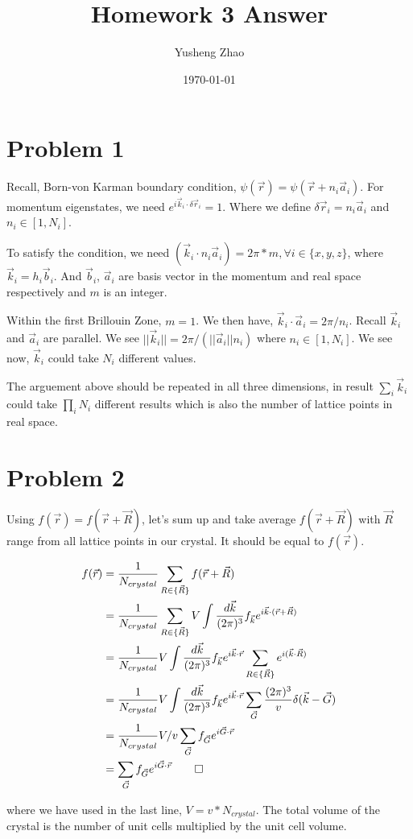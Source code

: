 \documentclass[11pt]{article}
\author{Yusheng Zhao}
\date{\today}
\title{Homework 3 Answer}
\begin{document}
\maketitle


\section{Problem 1}
\label{sec:org602696d}
Recall, Born-von Karman boundary condition, \(\psi(\vec{r}) =
\psi(\vec{r}+n_{i}\vec{a}_{i})\). For momentum eigenstates, we need \(e^{i
\vec{k}_{i}\cdot \delta \vec{r}_{i}} = 1\). Where we define \(\delta \vec{r}_{i}
= n_{i} \vec{a}_{i}\) and \(n_{i} \in [1,N_{i}]\).

To satisfy the condition, we need \((\vec{k}_{i} \cdot n_{i} \vec{a}_{i} ) =
2\pi * m, \forall i \in \{x,y,z\}\), where \(\vec{k}_{i} = h_{i} \vec{b}_{i}\). And
\(\vec{b}_{i}\), \(\vec{a}_{i}\) are basis vector in the momentum and real space
respectively and \(m\) is an integer.

Within the first Brillouin Zone, \(m=1\). We then have, \(\vec{k}_{i} \cdot
\vec{a}_{i} = 2\pi /n_{i}\). Recall \(\vec{k}_{i}\) and \(\vec{a}_{i}\) are
parallel. We see \(||\vec{k}_{i}|| = 2\pi /(||\vec{a}_{i}||n_{i})\) where \(n_{i}
\in [1,N_{i}]\). We see now, \(\vec{k}_{i}\) could take \(N_{i}\) different values.

The arguement above should be repeated in all three dimensions, in result
\(\sum_{i} \vec{k}_{i}\) could take \(\prod_{i}N_{i}\) different results which is
also the number of lattice points in real space.

\section{Problem 2}
\label{sec:orga628091}
Using \(f(\vec{r}) = f(\vec{r} + \vec{R})\), let's sum up and take average
\(f(\vec{r}+\vec{R})\) with \(\vec{R}\) range from all lattice points in our
crystal. It should be equal to \(f(\vec{r})\).



\begin{align*}
f(\vec{r}) & = \frac{1}{N_{crystal}} \sum_{R\in\{\vec{R}\}} f(\vec{r}+\vec{R}) \\
           & = \frac{1}{N_{crystal}} \sum_{R\in\{\vec{R}\}} V \int \frac{d\vec{k}}{(2\pi)^{3}} f_{\vec{k}} e^{i \vec{k}\cdot (\vec{r}+\vec{R})}\\
           & = \frac{1}{N_{crystal}}  V \int \frac{d\vec{k}}{(2\pi)^{3}} f_{\vec{k}}  e^{i \vec{k} \cdot \vec{r}} \sum_{R\in\{\vec{R}\}} e^{ i (\vec{k} \cdot \vec{R})}\\
           & = \frac{1}{N_{crystal}}  V \int \frac{d\vec{k}}{(2\pi)^{3}} f_{\vec{k}}  e^{i \vec{k}\cdot \vec{r}} \sum_{\vec{G}} \frac{(2\pi)^{3}}{v} \delta (\vec{k}-\vec{G})\\
           & = \frac{1}{N_{crystal}}  V/v \sum_{\vec{G}} f_{\vec{G}} e^{i\vec{G}\cdot \vec{r}}\\
           & = \sum_{\vec{G}} f_{\vec{G}} e^{i \vec{G} \cdot \vec{r}} \qed
\end{align*}

where we have used in the last line, \(V = v * N_{crystal}\). The total volume of
the crystal is the number of unit cells multiplied by the unit cell volume.
\end{document}

